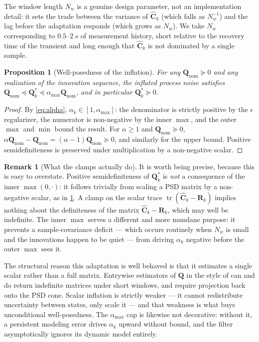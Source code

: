 \documentclass[11pt,a4paper]{article}
\newtheorem{proposition}[theorem]{Proposition}
\theoremstyle{definition}
\newtheorem{remark}[theorem]{Remark}
\numberwithin{equation}{section}
\newcommand{\tr}{\operatorname{tr}}
\begin{document}
The window length $N_w$ is a genuine design parameter, not an implementation detail: it sets the trade between the variance of $\hat{\mathbf{C}}_k$ (which falls as $N_w^{-1}$) and the lag before the adaptation responds (which grows as $N_w$). We take $N_w$ corresponding to $0.5$--$2$ s of measurement history, short relative to the recovery time of the transient and long enough that $\hat{\mathbf{C}}_k$ is not dominated by a single sample.

\begin{proposition}[Well-posedness of the inflation]
\label{prop:psd}
For any $\mathbf{Q}_{\text{nom}} \succeq 0$ and any realization of the innovation sequence, the inflated process noise satisfies $\mathbf{Q}_{\text{nom}} \preceq \mathbf{Q}_k^* \preceq \alpha_{\max}\mathbf{Q}_{\text{nom}}$, and in particular $\mathbf{Q}_k^* \succeq 0$.
\end{proposition}

\begin{proof}
By \cref{eq:alpha}, $\alpha_k \in [1, \alpha_{\max}]$: the denominator is strictly positive by the $\epsilon$ regularizer, the numerator is non-negative by the inner $\max$, and the outer $\max$ and $\min$ bound the result. For $\alpha \ge 1$ and $\mathbf{Q}_{\text{nom}} \succeq 0$, $\alpha\mathbf{Q}_{\text{nom}} - \mathbf{Q}_{\text{nom}} = (\alpha-1)\mathbf{Q}_{\text{nom}} \succeq 0$, and similarly for the upper bound. Positive semidefiniteness is preserved under multiplication by a non-negative scalar.
\end{proof}

\begin{remark}[What the clamps actually do]
\label{rem:clamps}
It is worth being precise, because this is easy to overstate. Positive semidefiniteness of $\mathbf{Q}_k^*$ is \emph{not} a consequence of the inner $\max(0,\cdot)$: it follows trivially from scaling a PSD matrix by a non-negative scalar, as in \cref{prop:psd}. A clamp on the scalar trace $\tr(\hat{\mathbf{C}}_k - \mathbf{R}_k)$ implies nothing about the definiteness of the matrix $\hat{\mathbf{C}}_k - \mathbf{R}_k$, which may well be indefinite. The inner $\max$ serves a different and more mundane purpose: it prevents a sample-covariance deficit --- which occurs routinely when $N_w$ is small and the innovations happen to be quiet --- from driving $\alpha_k$ negative before the outer $\max$ sees it.

The structural reason this adaptation is well behaved is that it estimates a single scalar rather than a full matrix. Entrywise estimators of $\mathbf{Q}$ in the style of \cite{mehra1970} can and do return indefinite matrices under short windows, and require projection back onto the PSD cone. Scalar inflation is strictly weaker --- it cannot redistribute uncertainty between states, only scale it --- and that weakness is what buys unconditional well-posedness. The $\alpha_{\max}$ cap is likewise not decorative: without it, a persistent modeling error drives $\alpha_k$ upward without bound, and the filter asymptotically ignores its dynamic model entirely.
\end{remark}
\end{document}
